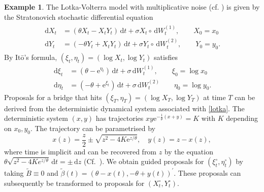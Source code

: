 \documentclass[preprint]{imsart}
\newcommand{\si}{\sigma}
\renewcommand{\th}{\theta}
\renewcommand{\tilde}{\widetilde}
\providecommand{\e}{\mathrm{e}}
\theoremstyle{definition}
\newtheorem{ex}[thm]{Example}
\newcommand{\dd}{{\,\mathrm d}}
\newcommand{\T}{{\prime}}
\begin{document}
\begin{ex}\label{ex:lotka}
The Lotka-Volterra model with multiplicative noise (cf. \cite{KhasminskiiKlebaner}) is given by the Stratonovich stochastic differential equation 
\begin{align}\label{lotka}
\begin{split}
\dd X_t &= \left(\theta X_t - X_tY_t\right)\dd t + \sigma X_t\circ \dd W^{(1)}_t,\qquad X_0 = x_0\\
\dd Y_t &= \left(-\theta Y_t + X_tY_t\right)\dd t + \sigma Y_t \circ \dd W^{(2)}_t,\qquad Y_0 = y_0.
\end{split}
\end{align}
By  It\=o's formula, $(\xi_t, \eta_t) = (\log X_t, \log Y_t)$ satisfies
\begin{align*}
\dd \xi_t &= \left(\theta  - \e^{\textstyle  \eta_t}\right)\dd t + \sigma\dd W^{(1)}_t, \qquad \xi_0 =\log x_0\\
\dd \eta_t &= \left(-\theta  + \e^{\textstyle  \xi_t}\right)\dd t + \sigma\dd W^{(2)}_t\qquad \eta_0=\log y_0.
\end{align*}
Proposals for a bridge  that hits $(\xi_T, \eta_T)=(\log X_T, \log Y_T)$ at time $T$  can be derived from the deterministic dynamical system associated with \eqref{lotka}.  
The deterministic system $(x, y)$ has trajectories $xy \e^{-\frac{1}{\theta} (x + y)} = K$ with $K$ depending on $x_0, y_0$. The trajectory can be parametrised by 
\[
x(z) = \frac{z}{2} \pm \sqrt{z^2 - 4 K \e^{z / \theta}}, \quad  y(z) = z - x(z),
\]
where time is implicit and can be recovered from $z$ by the equation $\theta \sqrt{z^2  - 4K e^{z/\theta}}\dd t = \pm \dd z$ (Cf.\  \cite{SteinerGander}). We obtain guided proposals for $(\xi^\circ_t, \eta^\circ_t)$ by taking $\tilde{B}\equiv 0$ and $\tilde\beta(t)= (\th-x(t), -\th + y(t))^\T$. These proposals can subsequently be transformed to proposals for $(X^\circ_t, Y^\circ_t)$.






\end{ex}
\end{document}
